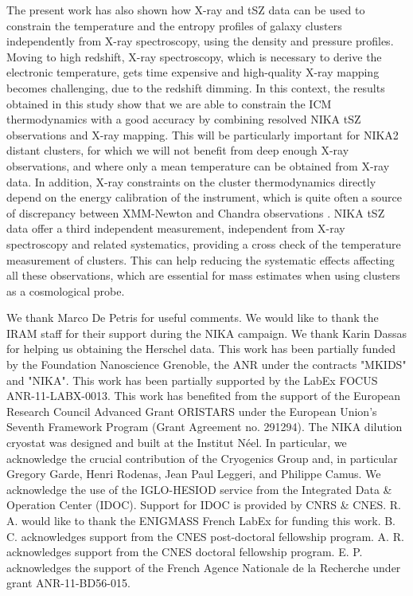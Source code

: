 \documentclass[twocolumn,traditabstract]{aa}
\begin{document}
The present work has also shown how X-ray and tSZ data can be used to constrain the temperature and the entropy profiles of galaxy clusters independently from X-ray spectroscopy, using the density and pressure profiles. Moving to high redshift, X-ray spectroscopy, which is necessary to derive the electronic temperature, gets time expensive and high-quality X-ray mapping becomes challenging, due to the redshift dimming. In this context, the results obtained in this study show that we are able to constrain the ICM thermodynamics with a good accuracy by combining resolved NIKA tSZ observations and X-ray mapping. This will be particularly important for NIKA2 distant clusters, for which we will not benefit from deep enough X-ray observations, and where only a mean temperature can be obtained from X-ray data. In addition, X-ray constraints on the cluster thermodynamics directly depend on the energy calibration of the instrument, which is quite often a source of discrepancy between XMM-Newton and Chandra observations \citep[see for example the recent work of][]{schellenberger2015}. NIKA tSZ data offer a third independent measurement, independent from X-ray spectroscopy and related systematics, providing a cross check of the temperature measurement of clusters. This can help reducing the systematic effects affecting all these observations, which are essential for mass estimates when using clusters as a cosmological probe.

\begin{acknowledgements}
We thank Marco De Petris for useful comments.
We would like to thank the IRAM staff for their support during the NIKA campaign.
We thank Karin Dassas for helping us obtaining the Herschel data.
This work has been partially funded by the Foundation Nanoscience Grenoble, the ANR under the contracts "MKIDS" and "NIKA". 
This work has been partially supported by the LabEx FOCUS ANR-11-LABX-0013. 
This work has benefited from the support of the European Research Council Advanced Grant ORISTARS under the European Union's Seventh Framework Program (Grant Agreement no. 291294).
The NIKA dilution cryostat was designed and built at the Institut N\'eel. In particular, we acknowledge the crucial contribution of the Cryogenics Group and, in particular Gregory Garde, Henri Rodenas, Jean Paul Leggeri, and Philippe Camus. 
We acknowledge the use of the IGLO-HESIOD service from the Integrated Data \& Operation Center (IDOC). Support for IDOC is provided by CNRS \& CNES. 
R. A. would like to thank the ENIGMASS French LabEx for funding this work. 
B. C. acknowledges support from the CNES post-doctoral fellowship program. 
A. R. acknowledges support from the CNES doctoral fellowship program. 
E. P. acknowledges the support of the French Agence Nationale de la Recherche under grant ANR-11-BD56-015.
\end{acknowledgements}


\end{document}
